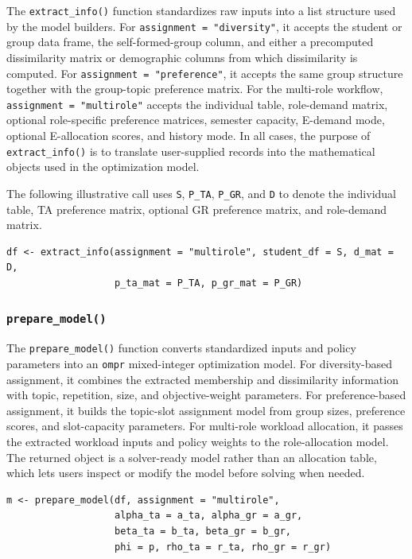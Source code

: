 The \texttt{extract\_info()} function standardizes raw inputs into a list structure
used by the model builders. For \texttt{assignment\ =\ "diversity"}, it accepts the
student or group data frame, the self-formed-group column, and either a
precomputed dissimilarity matrix or demographic columns from which dissimilarity
is computed. For \texttt{assignment\ =\ "preference"}, it accepts the same group
structure together with the group-topic preference matrix. For the multi-role
workflow, \texttt{assignment\ =\ "multirole"} accepts the individual table, role-demand
matrix, optional role-specific preference matrices, semester capacity,
E-demand mode, optional E-allocation scores, and history mode. In all cases,
the purpose of \texttt{extract\_info()} is to translate user-supplied records into the
mathematical objects used in the optimization model.

The following illustrative call uses \texttt{S}, \texttt{P\_TA}, \texttt{P\_GR}, and \texttt{D} to denote
the individual table, TA preference matrix, optional GR preference matrix, and
role-demand matrix.

\begin{verbatim}
df <- extract_info(assignment = "multirole", student_df = S, d_mat = D,
                   p_ta_mat = P_TA, p_gr_mat = P_GR)
\end{verbatim}

\subsubsection{\texorpdfstring{\texttt{prepare\_model()}}{prepare\_model()}}\label{prepare_model}

The \texttt{prepare\_model()} function converts standardized inputs and policy
parameters into an \texttt{ompr} mixed-integer optimization model. For diversity-based
assignment, it combines the extracted membership and dissimilarity information
with topic, repetition, size, and objective-weight parameters. For
preference-based assignment, it builds the topic-slot assignment model from
group sizes, preference scores, and slot-capacity parameters. For multi-role
workload allocation, it passes the extracted workload inputs and policy weights
to the role-allocation model. The returned object is a solver-ready model rather
than an allocation table, which lets users inspect or modify the model before
solving when needed.

\begin{verbatim}
m <- prepare_model(df, assignment = "multirole",
                   alpha_ta = a_ta, alpha_gr = a_gr,
                   beta_ta = b_ta, beta_gr = b_gr,
                   phi = p, rho_ta = r_ta, rho_gr = r_gr)
\end{verbatim}

